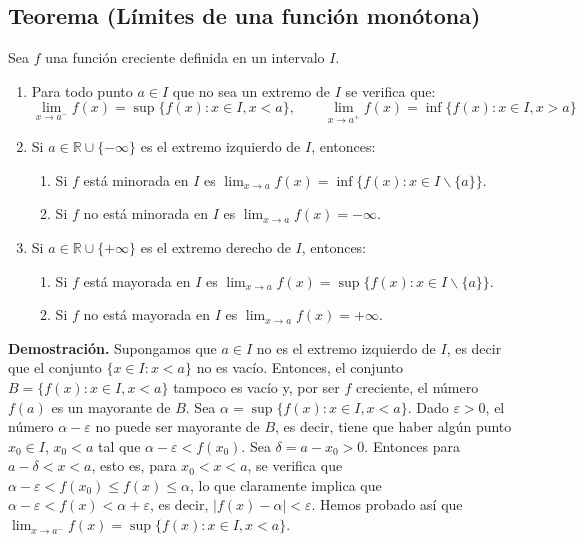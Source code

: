 \documentclass[10pt,a4paper]{article}
\begin{document}
	\subsection{Teorema (Límites de una función monótona)}
	Sea $f$ una función creciente definida en un intervalo $I$.
	
	\begin{enumerate}[label = \roman*)]
		\item Para todo punto $a \in I$ que no sea un extremo de $I$ se verifica que:
		$$ \lim_{x \rightarrow a^-}f(x) = \sup \{f(x):x \in I, x < a\}, \qquad \lim_{x \rightarrow a^+} f(x) = \inf \{f(x) : x \in I, x > a\}$$
		\item Si $a \in \mathbb{R} \cup \{- \infty\}$ es el extremo izquierdo de $I$, entonces:
		\begin{enumerate}[label = \alph*)]
			\item Si $f$ está minorada en $I$ es $\displaystyle \lim_{x \rightarrow a} f(x) = \inf \{f(x) : x \in I \backslash \{a\}\}$.
			\item Si $f$ no está minorada en $I$ es $\displaystyle \lim_{x \rightarrow a} f(x) = - \infty$.
		\end{enumerate}
		\item Si $a \in \mathbb{R} \cup \{+ \infty\}$ es el extremo derecho de $I$, entonces:
	
		\begin{enumerate}[label = \alph*)]
			\item Si $f$ está mayorada en $I$ es $\displaystyle \lim_{x \rightarrow a} f(x) = \sup \{f(x) : x \in I \backslash \{a\}\}$.
			\item Si $f$ no está mayorada en $I$ es $\displaystyle \lim_{x \rightarrow a} f(x) = + \infty$.
		\end{enumerate}
	\end{enumerate}
	
	\textbf{Demostración. }Supongamos que $a \in I$ no es el extremo izquierdo de $I$, es decir que el conjunto $\{x \in I : x < a\}$ no es vacío. Entonces, el conjunto $B = \{f(x):x \in I, x < a\}$ tampoco es vacío y, por ser $f$ creciente, el número $f(a)$ es un mayorante de $B$. Sea $\alpha = \sup \{f(x): x \in I, x < a\}$. Dado $\varepsilon > 0$, el número $\alpha - \varepsilon$ no puede ser mayorante de $B$, es decir, tiene que haber algún punto $x_0 \in I$, $x_0 < a$ tal que $\alpha - \varepsilon < f(x_0)$. Sea $\delta = a - x_0 > 0$. Entonces para $a - \delta < x < a$, esto es, para $x_0 < x < a$, se verifica que $\alpha - \varepsilon < f(x_0) \leq f(x) \leq \alpha$, lo que claramente implica que $\alpha - \varepsilon < f(x) < \alpha + \varepsilon$, es decir, $|f(x) - \alpha| < \varepsilon$. Hemos probado así que $\displaystyle \lim_{x \rightarrow a^-} f(x) = \sup \{f(x):x \in I, x < a\}$.
	
\end{document}
